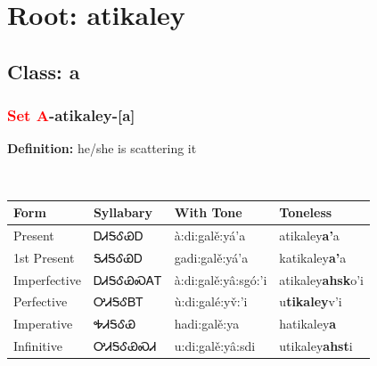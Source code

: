 \needspace{4in}
\section*{Root: atikaley}
\nopagebreak
{}
\needspace{3in}
\subsection*{Class: a}
\nopagebreak
\needspace{2in}
\subsubsection*{\textcolor{Red}{Set A}{-}\textbf{atikaley}{-}[a]}
\nopagebreak
\textbf{Definition: } he/she is scattering it
\\[0.5em]
\begin{tabularx}{\textwidth}{l X X X}%
\toprule%
\textbf{Form}&\textbf{Syllabary}&\textbf{With Tone}&\textbf{Toneless}\\%
\midrule%
Present&ᎠᏗᎦᎴᏯᎠ&à:di:galě:yá’a&atikaley\textbf{a'}a\\%
1st Present&ᎦᏗᎦᎴᏯᎠ&gadi:galě:yá’a&katikaley\textbf{a'}a\\%
Imperfective&ᎠᏗᎦᎴᏯᏍᎪᎢ&à:di:galě:yâ:sgó:’i&atikaley\textbf{ahsk}o'i\\%
Perfective&ᎤᏗᎦᎴᏴᎢ&ù:di:galé:yv̌:’i&u\textbf{tikaley}v'i\\%
Imperative&ᎭᏗᎦᎴᏯ&hadi:galě:ya&hatikaley\textbf{a}\\%
Infinitive&ᎤᏗᎦᎴᏯᏍᏗ&u:di:galě:yâ:sdi&utikaley\textbf{ahst}i\\%
\bottomrule%
\end{tabularx}
\\[1em]